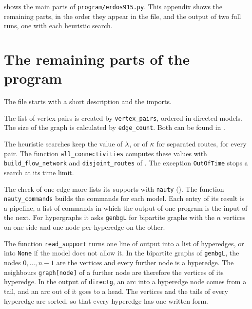  shows the main parts of \texttt{program/erdos915.py}.
This appendix shows the remaining parts, in the order they appear in the file, and the output of two full runs, one with each heuristic search.

\section{The remaining parts of the program}\label{sec:program-rest}

The file starts with a short description and the imports.


The list of vertex pairs is created by \texttt{vertex\_pairs}, ordered in directed models.
The size of the graph is calculated by \texttt{edge\_count}. Both can be found in .


The heuristic searches keep the value of $\lambda$, or of $\kappa$ for separated routes, for every pair. The function \texttt{all\_connectivities} computes these values with \texttt{build\_flow\_network} and \texttt{disjoint\_routes} of . The exception \texttt{OutOfTime} stops a search at its time limit.


The check of one edge more lists its supports with \texttt{nauty} (). The function \texttt{nauty\_commands} builds the commands for each model. Each entry of its result is a pipeline, a list of commands in which the output of one program is the input of the next. For hypergraphs it asks \texttt{genbgL} for bipartite graphs with the $n$ vertices on one side and one node per hyperedge on the other.


The function \texttt{read\_support} turns one line of output into a list of hyperedges, or into \texttt{None} if the model does not allow it.
In the bipartite graphs of \texttt{genbgL}, the nodes $0,\dots,n-1$ are the vertices and every further node is a hyperedge. The neighbours \texttt{graph[node]} of a further node are therefore the vertices of its hyperedge.
In the output of \texttt{directg}, an arc into a hyperedge node comes from a tail, and an arc out of it goes to a head.
The vertices and the tails of every hyperedge are sorted, so that every hyperedge has one written form.

